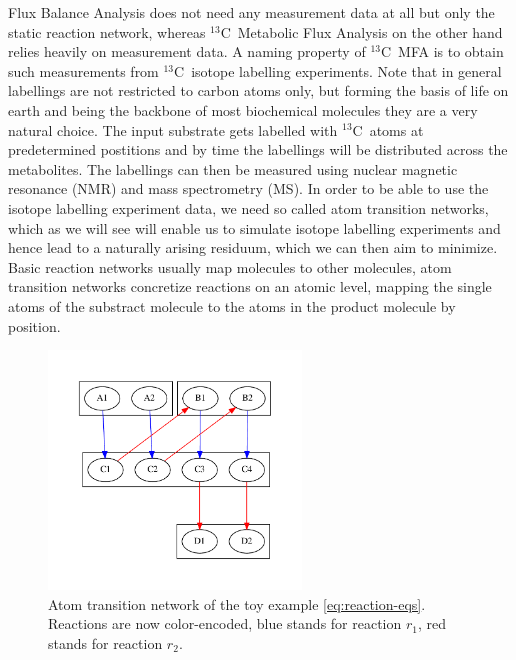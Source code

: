 \documentclass[10pt]{article}
\newcommand{\Ciso}{$^{13}$C~}
\begin{document}
Flux Balance Analysis does not need any measurement data at all but only the static reaction network,
whereas \Ciso Metabolic Flux Analysis on the other hand relies heavily on measurement data.
A naming property of \Ciso MFA is to obtain such measurements from \Ciso isotope labelling experiments.
Note that in general labellings are not restricted to carbon atoms only, but forming the basis of life on earth
and being the backbone of most biochemical molecules they are a very natural choice.
The input substrate gets labelled with \Ciso atoms at predetermined postitions and by time the labellings will be
distributed across the metabolites.
The labellings can then be measured using nuclear magnetic resonance (NMR) and mass spectrometry (MS).
In order to be able to use the isotope labelling experiment data, we need so called atom transition networks,
which as we will see will enable us to simulate isotope labelling experiments and hence lead to a naturally
arising residuum, which we can then aim to minimize.
Basic reaction networks usually map molecules to other molecules, atom transition networks concretize reactions 
on an atomic level, mapping the single atoms of the substract molecule
to the atoms in the product molecule by position.

\begin{figure}
    \centering
    \includegraphics[width=0.6\textwidth]{atom-transition-network}
    \caption{
	Atom transition network of the toy example \ref{eq:reaction-eqs}. 
	Reactions are now color-encoded, blue stands for reaction $r_1$, red stands for reaction $r_2$.
    }
    \label{fig:atom-trans}
\end{figure}
\end{document}
